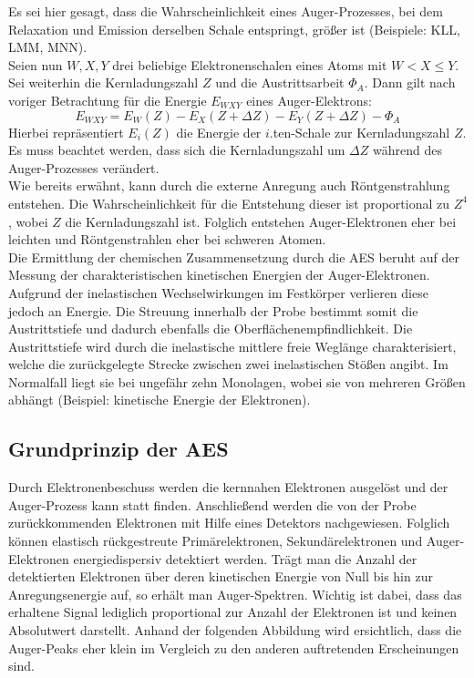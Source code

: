 	Es sei hier gesagt, dass die Wahrscheinlichkeit eines Auger-Prozesses, bei dem Relaxation und Emission derselben Schale entspringt, größer ist (Beispiele: KLL, LMM, MNN). \cite{description}\\

	Seien nun $W,X,Y$ drei beliebige Elektronenschalen eines Atoms mit $W < X \leq Y$. 
	Sei weiterhin die Kernladungszahl $Z$ und die Austrittsarbeit $\Phi_A$. 
	Dann gilt nach voriger Betrachtung für die Energie $E_{WXY}$ eines Auger-Elektrons:
	\[
		E_{WXY} = E_W(Z) - E_X(Z+\Delta Z) - E_Y(Z+\Delta Z) - \Phi_A
	\]
	Hierbei repräsentiert $E_i(Z)$ die Energie der $i$.ten-Schale zur Kernladungszahl $Z$.
	Es muss beachtet werden, dass sich die Kernladungszahl um $\Delta Z$ während des Auger-Prozesses verändert. \cite{article} \\

	Wie bereits erwähnt, kann durch die externe Anregung auch Röntgenstrahlung entstehen.
	Die Wahrscheinlichkeit für die Entstehung dieser ist proportional zu $Z^4$, wobei $Z$ die Kernladungszahl ist.
	Folglich entstehen Auger-Elektronen eher bei leichten und Röntgenstrahlen eher bei schweren Atomen. \cite{description} \\

	Die Ermittlung der chemischen Zusammensetzung durch die AES beruht auf der Messung der charakteristischen kinetischen Energien der Auger-Elektronen. 
	Aufgrund der inelastischen Wechselwirkungen im Festkörper verlieren diese jedoch an Energie. 
	Die Streuung innerhalb der Probe bestimmt somit die Austrittstiefe und dadurch ebenfalls die Oberflächenempfindlichkeit.
	Die Austrittstiefe wird durch die inelastische mittlere freie Weglänge charakterisiert, welche die zurückgelegte Strecke zwischen zwei inelastischen Stößen angibt.
	Im Normalfall liegt sie bei ungefähr zehn Monolagen, wobei sie von mehreren Größen abhängt (Beispiel: kinetische Energie der Elektronen). \cite{description}



\subsection{Grundprinzip der AES} %
\label{sub:grundprinzip_der_aes}

	Durch Elektronenbeschuss werden die kernnahen Elektronen ausgelöst und der Auger-Prozess kann statt finden. 
	Anschließend werden die von der Probe zurückkommenden Elektronen mit Hilfe eines Detektors nachgewiesen. 
	Folglich können elastisch rückgestreute Primärelektronen, Sekundärelektronen und Auger-Elektronen energiedispersiv detektiert werden.
	Trägt man die Anzahl der detektierten Elektronen über deren kinetischen Energie von Null bis hin zur Anregungsenergie auf, so erhält man Auger-Spektren.
	Wichtig ist dabei, dass das erhaltene Signal lediglich proportional zur Anzahl der Elektronen ist und keinen Absolutwert darstellt. \cite{description}
	Anhand der folgenden Abbildung wird ersichtlich, dass die Auger-Peaks eher klein im Vergleich zu den anderen auftretenden Erscheinungen sind. 

